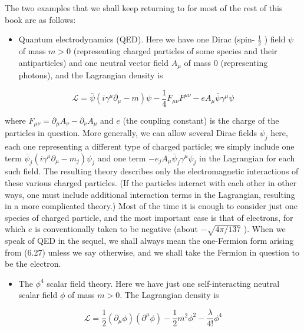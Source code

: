 \documentclass[10pt, letterpaper]{article}
\begin{document}
The two examples that we shall keep returning to for most of the rest of this book are as follows:

\begin{itemize}
  \item Quantum electrodynamics (QED). Here we have one Dirac (spin- $\frac{1}{2}$ ) field $\psi$ of mass $m>0$ (representing charged particles of some species and their antiparticles) and one neutral vector field $A_{\mu}$ of mass 0 (representing photons), and the Lagrangian density is
\end{itemize}

$$
\mathcal{L}=\bar{\psi}\left(i \gamma^{\mu} \partial_{\mu}-m\right) \psi-\frac{1}{4} F_{\mu \nu} F^{\mu \nu}-e A_{\mu} \bar{\psi} \gamma^{\mu} \psi
$$

where $F_{\mu \nu}=\partial_{\mu} A_{\nu}-\partial_{\nu} A_{\mu}$ and $e$ (the coupling constant) is the charge of the particles in question. More generally, we can allow several Dirac fields $\psi_{j}$ here, each one representing a different type of charged particle; we simply include one term $\bar{\psi}_{j}\left(i \gamma^{\mu} \partial_{\mu}-m_{j}\right) \psi_{j}$ and one term $-e_{j} A_{\mu} \bar{\psi}_{j} \gamma^{\mu} \psi_{j}$ in the Lagrangian for each such field. The resulting theory describes only the electromagnetic interactions of these various charged particles. (If the particles interact with each other in other ways, one must include additional interaction terms in the Lagrangian, resulting in a more complicated theory.) Most of the time it is enough to consider just one species of charged particle, and the most important case is that of electrons, for which $e$ is conventionally taken to be negative (about $-\sqrt{4 \pi / 137}$ ). When we speak of QED in the sequel, we shall always mean the one-Fermion form arising from (6.27) unless we say otherwise, and we shall take the Fermion in question to be the electron.

\begin{itemize}
  \item The $\phi^{4}$ scalar field theory. Here we have just one self-interacting neutral scalar field $\phi$ of mass $m>0$. The Lagrangian density is
\end{itemize}

$$
\mathcal{L}=\frac{1}{2}\left(\partial_{\mu} \phi\right)\left(\partial^{\mu} \phi\right)-\frac{1}{2} m^{2} \phi^{2}-\frac{\lambda}{4!} \phi^{4}
$$
\end{document}
